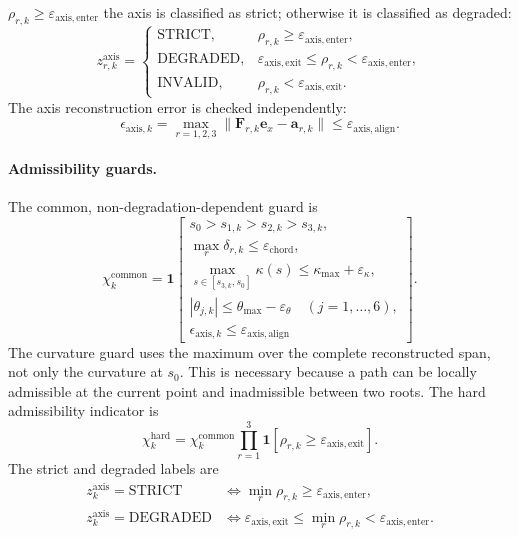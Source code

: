 \documentclass[12pt,a4paper]{report}
\begin{document}
$\rho_{r,k}\geq\varepsilon_{\mathrm{axis,enter}}$ the axis is classified as
strict; otherwise it is classified as degraded:
\begin{equation}
z_{r,k}^{\mathrm{axis}}=
\begin{cases}
\mathrm{STRICT},&\rho_{r,k}\geq\varepsilon_{\mathrm{axis,enter}},\\
\mathrm{DEGRADED},&
\varepsilon_{\mathrm{axis,exit}}\leq\rho_{r,k}
<\varepsilon_{\mathrm{axis,enter}},\\
\mathrm{INVALID},&\rho_{r,k}<\varepsilon_{\mathrm{axis,exit}}.
\end{cases}
\tag{8.103}
\label{eq:ch8-axis-class}
\end{equation}
The axis reconstruction error is checked independently:
\begin{equation}
\epsilon_{\mathrm{axis},k}
=\max_{r=1,2,3}
\|\mathbf{F}_{r,k}\mathbf{e}_x-\mathbf{a}_{r,k}\|
\leq\varepsilon_{\mathrm{axis,align}} .
\tag{8.104}
\label{eq:ch8-axis-alignment}
\end{equation}

\paragraph{Admissibility guards.}
The common, non-degradation-dependent guard is
\begin{equation}
\chi_k^{\mathrm{common}}
=\mathbf{1}\!\left[
\begin{array}{l}
s_0>s_{1,k}>s_{2,k}>s_{3,k},\\
\max_r\delta_{r,k}\leq\varepsilon_{\mathrm{chord}},\\
\max_{s\in[s_{3,k},s_0]}\kappa(s)
\leq\kappa_{\max}+\varepsilon_\kappa,\\
|\theta_{j,k}|\leq\theta_{\max}-\varepsilon_{\theta}
\quad (j=1,\ldots,6),\\
\epsilon_{\mathrm{axis},k}\leq\varepsilon_{\mathrm{axis,align}}
\end{array}\right].
\tag{8.105}
\label{eq:ch8-common-guard}
\end{equation}
The curvature guard uses the maximum over the complete reconstructed span,
not only the curvature at $s_0$. This is necessary because a path can be
locally admissible at the current point and inadmissible between two roots.
The hard admissibility indicator is
\begin{equation}
\chi_k^{\mathrm{hard}}
=\chi_k^{\mathrm{common}}
\prod_{r=1}^{3}
\mathbf{1}\!\left[
\rho_{r,k}\geq\varepsilon_{\mathrm{axis,exit}}
\right].
\tag{8.106}
\label{eq:ch8-hard-admissibility}
\end{equation}
The strict and degraded labels are
\begin{align}
z_k^{\mathrm{axis}}=\mathrm{STRICT}
&\Longleftrightarrow
\min_r\rho_{r,k}\geq\varepsilon_{\mathrm{axis,enter}},
\tag{8.107}\\
z_k^{\mathrm{axis}}=\mathrm{DEGRADED}
&\Longleftrightarrow
\varepsilon_{\mathrm{axis,exit}}
\leq\min_r\rho_{r,k}
<\varepsilon_{\mathrm{axis,enter}} .
\tag{8.108}
\end{align}
\end{document}
